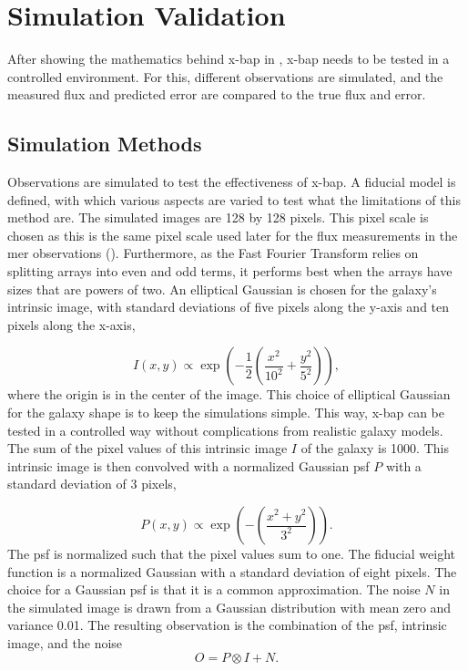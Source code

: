 \chapter{Simulation Validation}\label{sec: Simulation Framework}

After showing the mathematics behind \gls{x-bap} in , \gls{x-bap} needs to be tested in a controlled environment. For this, different observations are simulated, and the measured flux and predicted error are compared to the true flux and error.

\section{Simulation Methods}\label{sec: simulation methods}
Observations are simulated to test the effectiveness of \gls{x-bap}. A fiducial model is defined, with which various aspects are varied to test what the limitations of this method are. The simulated images are 128 by 128 pixels. This pixel scale is chosen as this is the same pixel scale used later for the flux measurements in the \gls{mer} observations (). Furthermore, as the Fast Fourier Transform relies on splitting arrays into even and odd terms, it performs best when the arrays have sizes that are powers of two.  An elliptical Gaussian is chosen for the galaxy's intrinsic image, with standard deviations of five pixels along the y-axis and ten pixels along the x-axis,

\begin{equation}
    I(x,y) \propto \exp\left(-\frac{1}{2}\left(\frac{x^2}{10^2}+\frac{y^2}{5^2}\right)\right),
\end{equation}
where the origin is in the center of the image. This choice of elliptical Gaussian for the galaxy shape is to keep the simulations simple. This way, \gls{x-bap} can be tested in a controlled way without complications from realistic galaxy models. 
The sum of the pixel values of this intrinsic image $I$ of the galaxy is 1000. This intrinsic image is then convolved with a normalized Gaussian \gls{psf} $P$ with a standard deviation of 3 pixels,

\begin{equation}
    P(x,y) \propto \exp\left(-\left(\frac{x^2+y^2}{3^2}\right)\right).
\end{equation}
The \gls{psf} is normalized such that the pixel values sum to one.
The fiducial weight function is a normalized Gaussian with a standard deviation of eight pixels. The choice for a Gaussian \gls{psf} is that it is a common approximation. The noise $N$ in the simulated image is drawn from a Gaussian distribution with mean zero and variance 0.01. The resulting observation is the combination of the \gls{psf}, intrinsic image, and the noise
\begin{equation}
    O = P\otimes I + N.
\end{equation}


